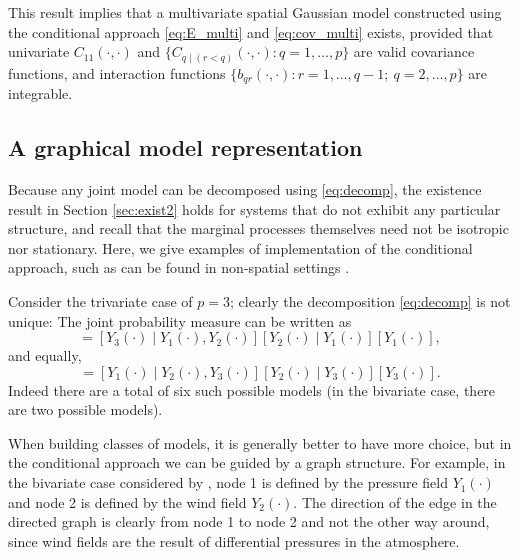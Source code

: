 \documentclass[lineno]{biometrika}
\begin{document}
This result implies that a multivariate spatial Gaussian model constructed using the conditional approach \eqref{eq:E_multi} and \eqref{eq:cov_multi} exists, provided that univariate $C_{11}(\cdot,\cdot)$ and $\{C_{q \mid  (r < q)}(\cdot,\cdot): q = 1,\dots,p\}$ are valid covariance functions, and interaction functions $\{b_{qr}(\cdot,\cdot) : r = 1,\dots,q-1;~q = 2,\dots,p\}$ are integrable. 

\subsection{A graphical model representation}

Because any joint model can be decomposed using \eqref{eq:decomp}, the existence result in Section \ref{sec:exist2} holds for systems that do not exhibit any particular structure, and recall that the marginal processes themselves need not be isotropic nor stationary. Here, we give examples of implementation of the conditional approach, such as can be found in non-spatial settings \citep[e.g.,~][]{Cox_1996}.

Consider the trivariate case of $p=3$; clearly the decomposition \eqref{eq:decomp} is not unique: The joint probability measure can be written as
\begin{equation*}
[Y_1(\cdot),Y_2(\cdot),Y_3(\cdot)]=[Y_3(\cdot)\mid Y_1(\cdot),Y_2(\cdot)][Y_2(\cdot)\mid Y_1(\cdot)][Y_1(\cdot)],
\end{equation*}
and equally,
\begin{equation*}
[Y_1(\cdot),Y_2(\cdot),Y_3(\cdot)]=[Y_1(\cdot)\mid Y_2(\cdot),Y_3(\cdot)][Y_2(\cdot)\mid Y_3(\cdot)][Y_3(\cdot)].
\end{equation*}
Indeed there are a total of six such possible models (in the bivariate case, there are two possible models). 

When building classes of models, it is generally better to have more choice, but in the conditional approach we can be guided by a graph structure. For example, in the bivariate case considered by \citet{Royleetal1999}, node 1 is defined by the pressure field $Y_1(\cdot)$ and node 2 is defined by the wind field $Y_2(\cdot)$. The direction of the edge in the directed graph is clearly from node 1 to node 2 and not the other way around, since wind fields are the result of differential pressures in the atmosphere. 
\end{document}
